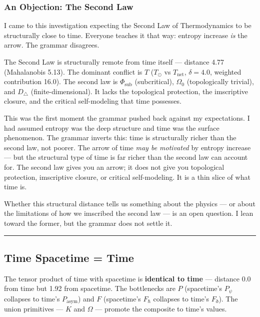 \documentclass[12pt,a4paper]{article}
\begin{document}
\subsubsection{An Objection: The Second Law}

I came to this investigation expecting the Second Law of Thermodynamics to be structurally close to time. Everyone teaches it that way: entropy increase \emph{is} the arrow. The grammar disagrees.

The Second Law is structurally remote from time itself --- distance 4.77 (Mahalanobis 5.13). The dominant conflict is $T$ ($T_{\odot}$ vs $T_\text{net}$, $\delta = 4.0$, weighted contribution 16.0). The second law is $\Phi_\text{sub}$ (subcritical), $\Omega_0$ (topologically trivial), and $D_{\triangle}$ (finite-dimensional). It lacks the topological protection, the imscriptive closure, and the critical self-modeling that time possesses.

This was the first moment the grammar pushed back against my expectations. I had assumed entropy was the deep structure and time was the surface phenomenon. The grammar inverts this: time is structurally richer than the second law, not poorer. The arrow of time \emph{may be motivated} by entropy increase --- but the structural type of time is far richer than the second law can account for. The second law gives you an arrow; it does not give you topological protection, imscriptive closure, or critical self-modeling. It is a thin slice of what time is.

Whether this structural distance tells us something about the physics --- or about the limitations of how we imscribed the second law --- is an open question. I lean toward the former, but the grammar does not settle it.

\begin{center}
\rule{0.5\textwidth}{0.4pt}
\end{center}

\subsection{Time \otimes Spacetime = Time}

The tensor product of time with spacetime is \textbf{identical to time} --- distance 0.0 from time but 1.92 from spacetime. The bottlenecks are $P$ (spacetime's $P_{\psi}$ collapses to time's $P_\text{asym}$) and $F$ (spacetime's $F_{\hbar}$ collapses to time's $F_{\eth}$). The union primitives --- $K$ and $\Omega$ --- promote the composite to time's values.
\end{document}
